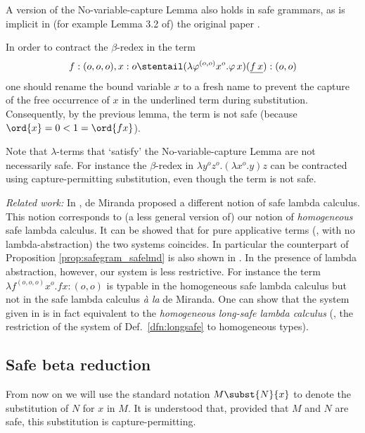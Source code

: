 \begin{remark}
  A version of the No-variable-capture Lemma also holds in safe
  grammars, as is implicit in (for example Lemma 3.2 of) the original
  paper \cite{KNU02}.
\end{remark}

\begin{example}
  In order to contract the $\beta$-redex in the term
\[f:(o,o,o),x:o
  \stentail (\lambda \varphi^{(o,o)} x^o . \varphi \, x) (\underline{f \,
    x}) : (o,o)\] one should rename the bound variable $x$ to a fresh name to
  prevent the capture of the free occurrence of $x$ in the underlined term during substitution. Consequently, by the previous lemma,
  the term is not safe (because $\ord{x} = 0 < 1
  = \ord{f x}$).
\end{example}

Note that $\lambda$-terms that `satisfy' the No-variable-capture
Lemma are not necessarily safe. For instance the $\beta$-redex in
$\lambda y^o z^o. (\lambda x^o .y) z$ can be contracted using
capture-permitting substitution, even though the term is not safe.
\bigskip

\emph{Related work:} In \cite{demirandathesis}, de Miranda proposed a different notion of safe lambda calculus. This notion corresponds to (a less general version of) our notion of \emph{homogeneous} safe lambda calculus. It can be showed that for pure applicative terms (\ie, with no lambda-abstraction) the two systems coincides. In particular the counterpart of Proposition \ref{prop:safegram_safelmd} is also shown in \cite{demirandathesis}. In the presence of lambda abstraction, however, our system is less restrictive. For instance the term $\lambda f^{(o,o,o)} x^o.  f x : (o,o)$ is typable in the homogeneous safe lambda calculus but not in the safe lambda calculus \emph{\`a la} de Miranda. One can show that the system given in \cite{demirandathesis} is in fact equivalent to the \emph{homogeneous long-safe lambda calculus} (\ie, the restriction of the system of Def.\ \ref{dfn:longsafe} to homogeneous types).

\subsection*{Safe beta reduction}

From now on we will use the standard notation $M\subst{N}{x}$ to
denote the substitution of $N$ for $x$ in $M$.  It is understood that,
provided that $M$ and $N$ are safe, this substitution is
capture-permitting.


